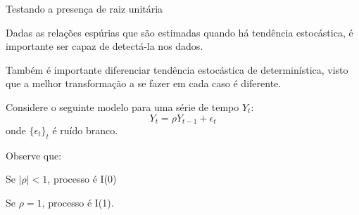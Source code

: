 \documentclass[11pt]{beamer}
\newenvironment{wideitemize}{\itemize\addtolength{\itemsep}{10pt}}{\enditemize}
\newenvironment{halfwideitemize}{\itemize\addtolength{\itemsep}{0.5em}}{\enditemize}
\newenvironment{halfwideenumerate}{\enumerate\addtolength{\itemsep}{0.5em}}{\endenumerate}
\begin{document}
\begin{frame}{Testando a presença de raiz unitária}
	\begin{wideitemize}
		\item Dadas as relações espúrias que são estimadas quando há tendência estocástica, é importante ser capaz de detectá-la nos dados.
		\begin{halfwideitemize}
			\item Também é importante diferenciar tendência estocástica de determinística, visto que a melhor transformação a se fazer em cada caso é diferente.
		\end{halfwideitemize}
		\item Considere o seguinte modelo para uma série de tempo $Y_t$:
		\begin{equation}
			\label{eq_rho}
			Y_t = \rho Y_{t-1} + \epsilon_t
		\end{equation}
		onde $\{\epsilon_t\}_t$ é ruído branco.
		\item Observe que:
		\begin{halfwideenumerate}
			\item Se $|\rho| < 1$, processo é I(0)
			\item Se $\rho = 1$, processo é I(1).
		\end{halfwideenumerate}
	\end{wideitemize}
\end{frame}
\end{document}
